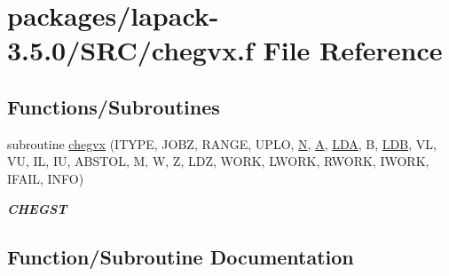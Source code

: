 \hypertarget{chegvx_8f}{}\section{packages/lapack-\/3.5.0/\+S\+R\+C/chegvx.f File Reference}
\label{chegvx_8f}
\subsection*{Functions/\+Subroutines}
\begin{DoxyCompactItemize}
\item 
subroutine \hyperlink{chegvx_8f_ad5f5ddf0eee1402d59fc1017de0fc291}{chegvx} (I\+T\+Y\+P\+E, J\+O\+B\+Z, R\+A\+N\+G\+E, U\+P\+L\+O, \hyperlink{polmisc_8c_a0240ac851181b84ac374872dc5434ee4}{N}, \hyperlink{classA}{A}, \hyperlink{example__user_8c_ae946da542ce0db94dced19b2ecefd1aa}{L\+D\+A}, B, \hyperlink{example__user_8c_a50e90a7104df172b5a89a06c47fcca04}{L\+D\+B}, V\+L, V\+U, I\+L, I\+U, A\+B\+S\+T\+O\+L, M, W, Z, L\+D\+Z, W\+O\+R\+K, L\+W\+O\+R\+K, R\+W\+O\+R\+K, I\+W\+O\+R\+K, I\+F\+A\+I\+L, I\+N\+F\+O)
\begin{DoxyCompactList}\small\item\em {\bfseries C\+H\+E\+G\+S\+T} \end{DoxyCompactList}\end{DoxyCompactItemize}


\subsection{Function/\+Subroutine Documentation}
\hypertarget{chegvx_8f_ad5f5ddf0eee1402d59fc1017de0fc291}{}

